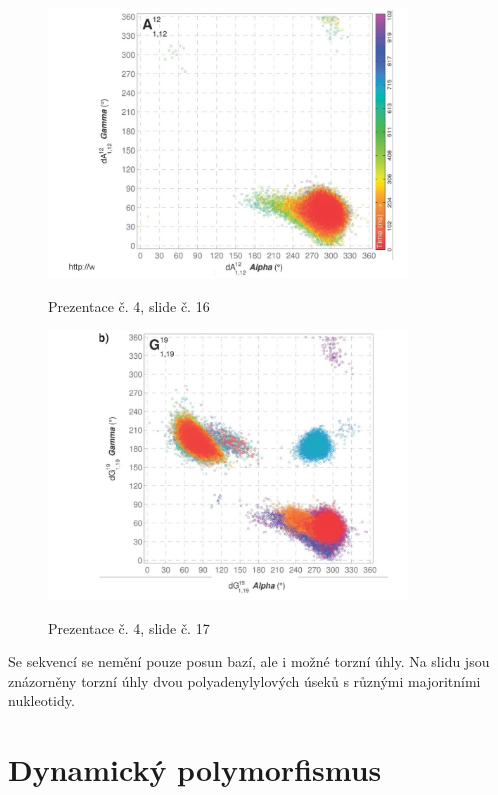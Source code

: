 \documentclass[DIV=8]{scrreprt}
\begin{document}
\begin{figure}
    \caption{Prezentace č. 4, slide č. 16}
    \includegraphics[width=0.85\textwidth]{slides-4/slide-16.jpg}
    \centering
    \label{slides-4-slide-16}
\end{figure}
\begin{figure}
    \caption{Prezentace č. 4, slide č. 17}
    \includegraphics[width=0.85\textwidth]{slides-4/slide-17.jpg}
    \centering
    \label{slides-4-slide-17}
\end{figure}
 Se sekvencí se nemění pouze posun bazí, ale i možné torzní úhly. Na slidu jsou znázorněny torzní úhly dvou polyadenylylových úseků s různými majoritními nukleotidy.

\section{Dynamický polymorfismus} \label{Dynamický polymorfismus}
\end{document}
